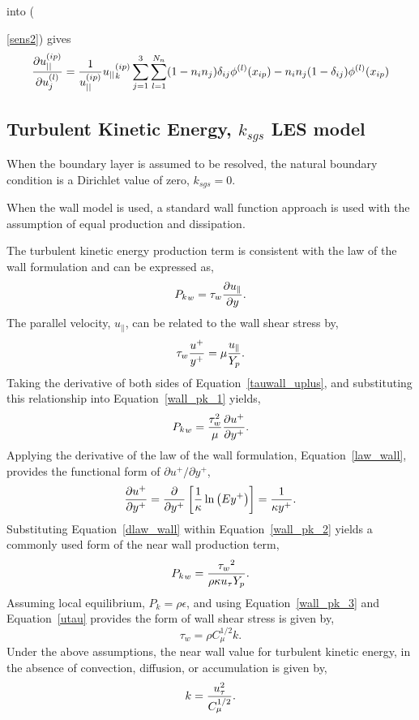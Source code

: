 into ({\ref{sens2}) gives
\begin{equation}
 \frac{\partial u_{||}^{(ip)}}{\partial u_{j}^{(l)}} = \frac{1}{u_{||}^{(ip)}}
   {u_{||}}_k^{(ip)} \sum_{j=1}^3 \sum_{l=1}^{N_n} (1 - n_i n_j)
   \delta_{ij} \phi^{(l)}(x_{ip}) - n_i n_j (1 -
   \delta_{ij})\phi^{(l)}(x_{ip})
\end{equation}

\subsection{Turbulent Kinetic Energy, $k_{sgs}$ LES model}
When the boundary layer is assumed to be resolved, the natural boundary condition is a Dirichlet value of zero, 
$k_{sgs} = 0$. 

When the wall model is used, a standard wall function approach is used with the assumption of equal production and
dissipation.

The turbulent kinetic energy production term is consistent with the law of the wall formulation and can be expressed as,
%
\begin{equation}
        {P_k}_w = \tau_w {{\partial u_{\|}} \over {\partial y}}.
\label{wall_pk_1}
\end{equation}
%
The parallel velocity, $u_{\|}$, can be related to the wall shear stress by,
%
\begin{equation}
        \tau_w {u^+ \over y^+ } = \mu {u_{\|} \over Y_p }.
\label{tauwall_uplus}
\end{equation}
%
Taking the derivative of both sides of Equation~\ref{tauwall_uplus}, and
substituting this relationship into Equation~\ref{wall_pk_1} yields,
%
\begin{equation} 
        {P_k}_w = {\tau_w^2 \over \mu} {{\partial u^+} \over {\partial y^+}}.
\label{wall_pk_2}
\end{equation}
%
Applying the derivative of the law of the wall formulation, Equation~\ref{law_wall},
provides the functional form of ${\partial u^+ / \partial y^+}$,
%
\begin{equation} 
        {\partial u^+ \over \partial y^+}
      = {\partial \over \partial y^+}
       \left[{ 1 \over \kappa } \ln \left(Ey^+\right) \right]
      = {1 \over \kappa y^+}.
\label{dlaw_wall}
\end{equation}
%
Substituting Equation~\ref{dlaw_wall} within Equation~\ref{wall_pk_2} yields
a commonly used form of the near wall production term,
%
\begin{equation}
        {P_k}_w = {{\tau_w}^2 \over \rho\kappa u_{\tau} Y_p}.
\label{wall_pk_3}
\end{equation}
%
Assuming local equilibrium, $P_k = \rho\epsilon$, and using
Equation~\ref{wall_pk_3} and Equation~\ref{utau} provides the form 
of wall shear stress is given by,
%
\begin{equation}
        \tau_w = \rho C_\mu^{1/2} k.
\label{wall_tauw_equil}
\end{equation}
%
Under the above assumptions, the near wall value for turbulent kinetic 
energy, in the absence of convection, diffusion, or accumulation is given by,
%
\begin{equation}
   k = {{u_\tau^2} \over {C_\mu^{1/2}}}.
\label{wall_tke}
\end{equation}

}
